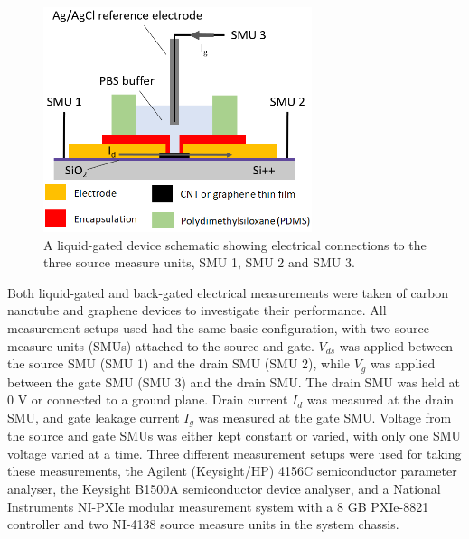 \documentclass[
  a4paper,
]{scrbook}
\begin{document}
\begin{figure}

{\centering \includegraphics[width=0.7\textwidth,height=\textheight]{figures/ch4/liquid-gate-schematic.png}

}

\caption[A liquid-gated device schematic showing electrical connections
to the three source measure units, SMU 1, SMU 2 and SMU
3.]{\label{fig-liquid-gate}A liquid-gated device schematic showing
electrical connections to the three source measure units, SMU 1, SMU 2
and SMU 3.}

\end{figure}

Both liquid-gated and back-gated electrical measurements were taken of
carbon nanotube and graphene devices to investigate their performance.
All measurement setups used had the same basic configuration, with two
source measure units (SMUs) attached to the source and gate. \(V_{ds}\)
was applied between the source SMU (SMU 1) and the drain SMU (SMU 2),
while \(V_{g}\) was applied between the gate SMU (SMU 3) and the drain
SMU. The drain SMU was held at 0 V or connected to a ground plane. Drain
current \(I_{d}\) was measured at the drain SMU, and gate leakage
current \(I_{g}\) was measured at the gate SMU. Voltage from the source
and gate SMUs was either kept constant or varied, with only one SMU
voltage varied at a time. Three different measurement setups were used
for taking these measurements, the Agilent (Keysight/HP) 4156C
semiconductor parameter analyser, the Keysight B1500A semiconductor
device analyser, and a National Instruments NI-PXIe modular measurement
system with a 8 GB PXIe-8821 controller and two NI-4138 source measure
units in the system chassis.
\end{document}
